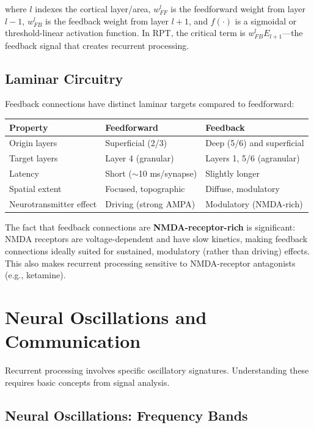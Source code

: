 \documentclass[11pt,a4paper]{report}
\begin{document}
where $l$ indexes the cortical layer/area, $w_{FF}^l$ is the feedforward weight from layer $l{-}1$, $w_{FB}^l$ is the feedback weight from layer $l{+}1$, and $f(\cdot)$ is a sigmoidal or threshold-linear activation function. In RPT, the critical term is $w_{FB}^l E_{l+1}$---the feedback signal that creates recurrent processing.

\subsection{Laminar Circuitry}

Feedback connections have distinct laminar targets compared to feedforward:

\begin{center}
\renewcommand{\arraystretch}{1.3}
\begin{tabular}{>{\raggedright}p{3.5cm} >{\raggedright}p{4.5cm} >{\raggedright\arraybackslash}p{4.5cm}}
  \toprule
  \textbf{Property} & \textbf{Feedforward} & \textbf{Feedback} \\
  \midrule
  Origin layers & Superficial (2/3) & Deep (5/6) and superficial \\
  Target layers & Layer 4 (granular) & Layers 1, 5/6 (agranular) \\
  Latency & Short ($\sim$10 ms/synapse) & Slightly longer \\
  Spatial extent & Focused, topographic & Diffuse, modulatory \\
  Neurotransmitter effect & Driving (strong AMPA) & Modulatory (NMDA-rich) \\
  \bottomrule
\end{tabular}
\end{center}

The fact that feedback connections are \textbf{NMDA-receptor-rich} is significant: NMDA receptors are voltage-dependent and have slow kinetics, making feedback connections ideally suited for sustained, modulatory (rather than driving) effects. This also makes recurrent processing sensitive to NMDA-receptor antagonists (e.g., ketamine).

\section{Neural Oscillations and Communication}

Recurrent processing involves specific oscillatory signatures. Understanding these requires basic concepts from signal analysis.

\subsection{Neural Oscillations: Frequency Bands}
\end{document}
